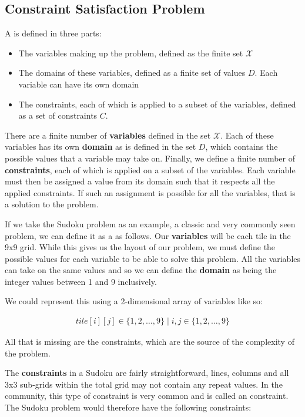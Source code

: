 \documentclass[../Document.tex]{subfiles}
\begin{document}
\subsection{Constraint Satisfaction Problem}
A \csp is defined in three parts:
\begin{itemize}
    \item The variables making up the problem, defined as the finite set $\mathcal{X}$
    \item The domains of these variables, defined as a finite set of values $D$. Each variable can have its own domain
    \item The constraints, each of which is applied to a subset of the variables, defined as a set of constraints $C$.
\end{itemize}

There are a finite number of \textbf{variables} defined in the set $\mathcal{X}$. Each of these variables has its own \textbf{domain} as is defined in the set $D$, which contains the possible values that a variable may take on. Finally, we define a finite number of \textbf{constraints}, each of which is applied on a subset of the variables. Each variable must then be assigned a value from its domain such that it respects all the applied constraints. If such an assignment is possible for all the variables, that is a solution to the problem.

If we take the Sudoku problem as an example, a classic and very commonly seen problem, we can define it as a \csp as follows.
Our \textbf{variables} will be each tile in the 9x9 grid. While this gives us the layout of our problem, we must define the possible values for each variable to be able to solve this problem.
All the variables can take on the same values and so we can define the \textbf{domain} as being the integer values between 1 and 9 inclusively. 

We could represent this using a 2-dimensional array of variables like so:

\begin{align}
    tile[i][j] \in \{1,2,\dots,9\} \mid i,j \in \{1,2,\dots,9\}
\end{align}

All that is missing are the constraints, which are the source of the complexity of the problem.

The \textbf{constraints} in a Sudoku are fairly straightforward, lines, columns and all 3x3 sub-grids within the total grid may not contain any repeat values.
In the \cp community, this type of constraint is very common and is called an \alldifferent constraint. The Sudoku problem would therefore have the following constraints:
\end{document}
